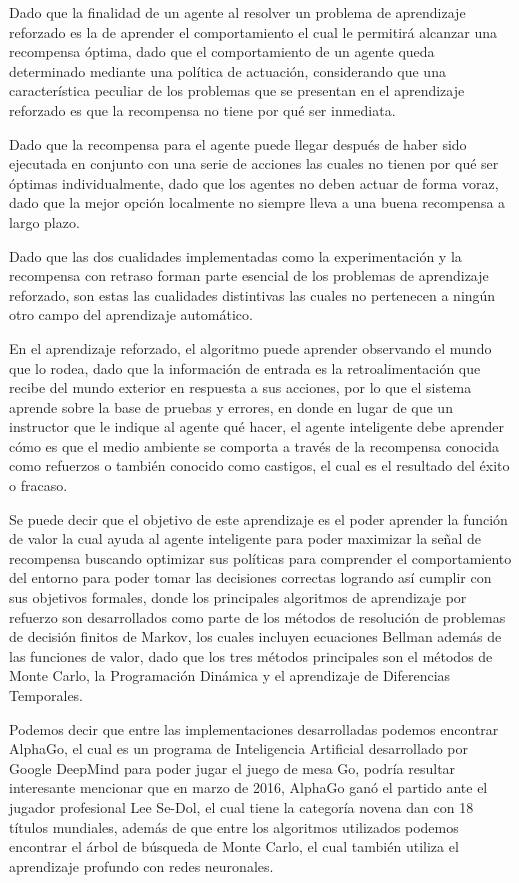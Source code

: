 Dado que la finalidad de un agente al resolver un problema de aprendizaje reforzado es la de aprender el comportamiento el cual le permitirá alcanzar una recompensa óptima, dado que el comportamiento de un agente queda determinado mediante una política de actuación, considerando que una característica peculiar de los problemas que se presentan en el aprendizaje reforzado es que la recompensa no tiene por qué ser inmediata.
 
Dado que la recompensa para el agente puede llegar después de haber sido ejecutada en conjunto con una serie de acciones las cuales no tienen por qué ser óptimas individualmente, dado que los agentes no deben actuar de forma voraz, dado que la mejor opción localmente no siempre lleva a una buena recompensa a largo plazo.

Dado que las dos cualidades implementadas como la experimentación y la recompensa con retraso forman parte esencial de los problemas de aprendizaje reforzado, son estas las cualidades distintivas las cuales no pertenecen a ningún otro campo del aprendizaje automático.

En el aprendizaje reforzado, el algoritmo puede aprender observando el mundo que lo rodea, dado que la información de entrada es la retroalimentación que recibe del mundo exterior en respuesta a sus acciones, por lo que el sistema aprende sobre la base de pruebas y errores, en donde en lugar de que un instructor que le indique al agente qué hacer, el agente inteligente debe aprender cómo es que el medio ambiente se comporta a través de la recompensa conocida como refuerzos o también conocido como castigos, el cual es el resultado del éxito o fracaso.

Se puede decir que el objetivo de este aprendizaje es el poder aprender la función de valor la cual ayuda al agente inteligente para poder maximizar la señal de recompensa buscando optimizar sus políticas para comprender el comportamiento del entorno para poder tomar las decisiones correctas logrando así cumplir con sus objetivos formales, donde los principales algoritmos de aprendizaje por refuerzo son desarrollados como parte de los métodos de resolución de problemas de decisión finitos de Markov, los cuales incluyen ecuaciones Bellman además de las funciones de valor, dado que los tres métodos principales son el métodos de Monte Carlo, la Programación Dinámica y el aprendizaje de Diferencias Temporales.

Podemos decir que entre las implementaciones desarrolladas podemos encontrar AlphaGo, el cual es un programa de Inteligencia Artificial desarrollado por Google DeepMind para poder jugar el juego de mesa Go, podría resultar interesante mencionar que en marzo de 2016, AlphaGo ganó el partido ante el jugador profesional Lee Se-Dol, el cual tiene la categoría novena dan con 18 títulos mundiales, además de que entre los algoritmos utilizados podemos encontrar el árbol de búsqueda de Monte Carlo, el cual también utiliza el aprendizaje profundo con redes neuronales.

